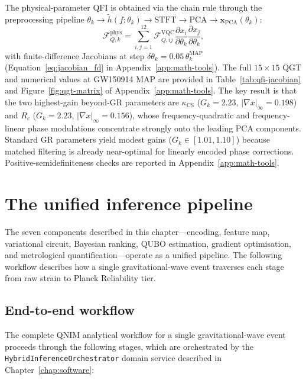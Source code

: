 \documentclass[11pt,a4paper, english]{book}
\theoremstyle{plain}
\theoremstyle{definition}
\numberwithin{equation}{chapter}
\numberwithin{figure}{chapter}
\numberwithin{table}{chapter}
\begin{document}
The physical-parameter QFI is obtained via the chain rule through the
preprocessing pipeline
$\theta_k \!\to\! \tilde{h}(f;\theta_k) \!\to\! \mathrm{STFT} \!\to\! \mathrm{PCA}
\!\to\! \mathbf{x}_\mathrm{PCA}(\theta_k)$:
\begin{equation}
  \label{eq:qfi_physical}
  \mathcal{F}_{Q,k}^\mathrm{phys} = \sum_{i,j=1}^{12}
    \mathcal{F}_{Q,ij}^\mathrm{VQC}
    \frac{\partial x_i}{\partial \theta_k}
    \frac{\partial x_j}{\partial \theta_k},
\end{equation}
with finite-difference Jacobians at step $\delta\theta_k = 0.05\,\theta_k^\mathrm{MAP}$
(Equation~\ref{eq:jacobian_fd} in Appendix~\ref{app:math-tools}). The full
$15\times15$ QGT and numerical values at GW150914 MAP are provided in
Table~\ref{tab:qfi-jacobian} and Figure~\ref{fig:qgt-matrix} of
Appendix~\ref{app:math-tools}. The key result is that the two highest-gain
beyond-GR parameters are $\kappa_\mathrm{CS}$ ($G_k = 2.23$,
$|\nabla x|_\infty = 0.198$) and $R_c$ ($G_k = 2.23$,
$|\nabla x|_\infty = 0.156$), whose frequency-quadratic and
frequency-linear phase modulations concentrate strongly onto the leading
PCA components. Standard GR parameters yield modest gains
($G_k \in [1.01, 1.10]$) because matched filtering is already near-optimal
for linearly encoded phase corrections. Positive-semidefiniteness checks
are reported in Appendix~\ref{app:math-tools}.

\section{The unified inference pipeline}
\label{sec:pipeline}

The seven components described in this chapter—encoding, feature map, variational
circuit, Bayesian ranking, QUBO estimation, gradient optimisation, and metrological
quantification—operate as a unified pipeline. The following workflow describes how
a single gravitational-wave event traverses each stage from raw strain to Planck
Reliability tier.

\subsection{End-to-end workflow}
\label{subsec:workflow}

The complete QNIM analytical workflow for a single gravitational-wave
event proceeds through the following stages, which are orchestrated by
the \texttt{HybridInferenceOrchestrator} domain service described in Chapter~\ref{chap:software}:
\end{document}
